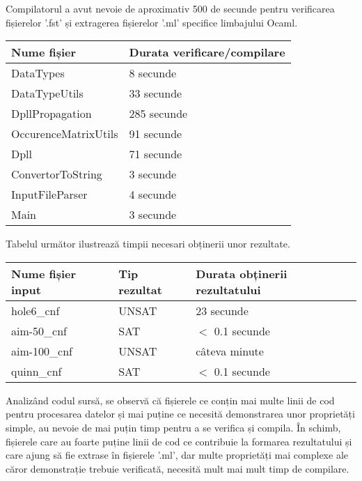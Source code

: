 Compilatorul a avut nevoie de aproximativ 500 de secunde pentru verificarea fișierelor '.fst' și extragerea fișierelor '.ml' specifice limbajului Ocaml. 
\newline
\begin{center}

\begin{tabular}{|l|l|} \hline
	Nume fișier & Durata verificare/compilare \\\hline
	DataTypes & 8 secunde \\\hline
	DataTypeUtils & 33 secunde \\\hline
	DpllPropagation & 285 secunde \\\hline
	OccurenceMatrixUtils & 91 secunde \\\hline
	Dpll & 71 secunde \\\hline
	ConvertorToString & 3 secunde \\\hline
	InputFileParser & 4 secunde \\\hline
	Main & 3 secunde \\\hline	
\end{tabular}
\end{center}

Tabelul următor ilustrează timpii necesari obținerii unor rezultate.
\begin{center}
\begin{tabular}{|l|l|l|} \hline
	Nume fișier input & Tip rezultat & Durata obținerii rezultatului \\\hline
	hole6\_cnf & UNSAT & 23 secunde \\\hline
	aim-50\_cnf & SAT & $<$ 0.1 secunde \\\hline
	aim-100\_cnf & UNSAT & câteva minute \\\hline
	quinn\_cnf & SAT & $<$ 0.1 secunde \\\hline

\end{tabular}
\end{center}

Analizând codul sursă, se observă că fișierele ce conțin mai multe linii de cod pentru procesarea datelor și mai puține ce necesită demonstrarea unor proprietăți simple, au nevoie de mai puțin timp pentru a se verifica și compila. În schimb, fișierele care au foarte puține linii de cod ce contribuie la formarea rezultatului și care ajung să fie extrase în fișierele '.ml', dar multe proprietăți mai complexe ale căror demonstrație trebuie verificată, necesită mult mai mult timp de compilare.
\newpage

